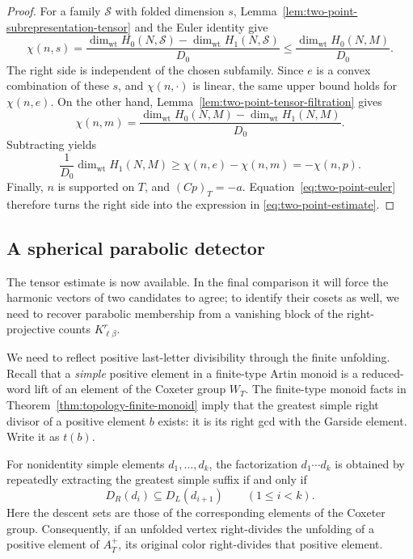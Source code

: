 \begin{proof}
For a family \(\mathcal S\) with folded dimension \(s\),
Lemma~\ref{lem:two-point-subrepresentation-tensor} and the Euler
identity give
\[
 \chi(n,s)
  =\frac{\dim_{\mathrm{wt}}H_0(N,\mathcal S)
             -\dim_{\mathrm{wt}}H_1(N,\mathcal S)}{D_0}
  \le\frac{\dim_{\mathrm{wt}}H_0(N,M)}{D_0}.
\]
The right side is independent of the chosen subfamily.  Since
\(e\) is a convex combination of these \(s\), and
\(\chi(n,\cdot)\) is linear, the same upper bound holds for
\(\chi(n,e)\).  On the other hand,
Lemma~\ref{lem:two-point-tensor-filtration} gives
\[
 \chi(n,m)
   =\frac{\dim_{\mathrm{wt}}H_0(N,M)
             -\dim_{\mathrm{wt}}H_1(N,M)}{D_0}.
\]
Subtracting yields
\[
 \frac1{D_0}\dim_{\mathrm{wt}}H_1(N,M)
    \ge\chi(n,e)-\chi(n,m)=-\chi(n,p).
\]
Finally, \(n\) is supported on \(T\), and \((Cp)_T=-a\).
Equation~\eqref{eq:two-point-euler} therefore turns the right side
into the expression in \eqref{eq:two-point-estimate}.
\end{proof}

\subsection{A spherical parabolic detector}

The tensor estimate is now available.  In the final comparison it will
force the harmonic vectors of two candidates to agree; to identify their
cosets as well, we need to recover parabolic membership from a vanishing
block of the right-projective counts \(K^r_{\ell\beta}\).

We need to reflect positive last-letter divisibility through the
finite unfolding.  Recall that a \emph{simple} positive element in a
finite-type Artin monoid is a reduced-word lift of an element of the
Coxeter group \(W_T\).
The finite-type monoid facts in
Theorem~\ref{thm:topology-finite-monoid} imply that the greatest simple
right divisor of a positive element \(b\) exists: it is its right gcd
with the Garside element.  Write it as \(t(b)\).

\begin{lemma}
\label{lem:two-point-greedy}
For nonidentity simple elements \(d_1,\ldots,d_k\), the factorization
\(d_1\cdots d_k\) is obtained by repeatedly extracting the greatest
simple suffix if and only if
\begin{equation}
\label{eq:two-point-greedy-condition}
 D_R(d_i)\subseteq D_L(d_{i+1})\qquad(1\le i<k).
\end{equation}
Here the descent sets are those of the corresponding elements of
the Coxeter group.  Consequently, if an unfolded vertex right-divides the
unfolding of a positive element of \(A_T^+\), its original color
right-divides that positive element.
\end{lemma}

